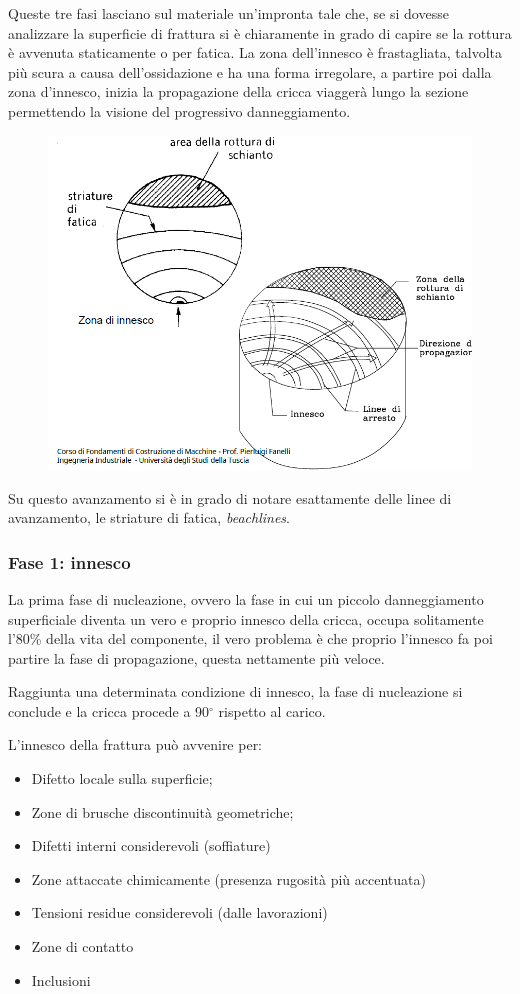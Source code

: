 		Queste tre fasi lasciano sul materiale un'impronta tale che, se si dovesse analizzare la superficie di frattura si è chiaramente in grado di capire se la rottura è avvenuta staticamente o per fatica. La zona dell'innesco è frastagliata, talvolta più scura a causa dell'ossidazione e ha una forma irregolare, a partire poi dalla zona d'innesco, inizia la propagazione della cricca viaggerà lungo la sezione permettendo la visione del progressivo danneggiamento.
		
		\begin{figure}[H]
			\centering
			\includegraphics[width=0.5\linewidth]{immagini_10/screenshot006}
			\label{fig:screenshot006}
		\end{figure}		
		
		Su questo avanzamento si è in grado di notare esattamente delle linee di avanzamento, le striature di fatica, \textit{beachlines}.
		
\subsubsection{		Fase 1: innesco}
		La prima fase di nucleazione, ovvero la fase in cui un piccolo danneggiamento superficiale diventa un vero e proprio innesco della cricca, occupa solitamente l'80\% della vita del componente, il vero problema è che proprio l'innesco fa poi partire la fase di propagazione, questa nettamente più veloce.
	
		Raggiunta una determinata condizione di innesco, la fase di nucleazione si conclude e la
		cricca procede a 90$^\circ$ rispetto al carico. \newline
		
		L'innesco della frattura può avvenire per:
		\begin{itemize}
			\item Difetto locale sulla superficie;
			\item Zone di brusche discontinuità geometriche;
			\item Difetti interni considerevoli (soffiature)
			\item Zone attaccate chimicamente (presenza rugosità più accentuata)
			\item Tensioni residue considerevoli (dalle lavorazioni)
			\item Zone di contatto
			\item Inclusioni
		\end{itemize} 
	
